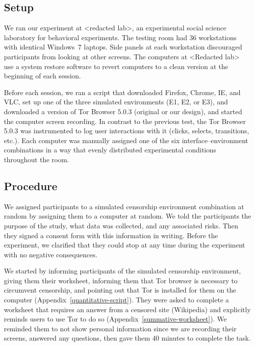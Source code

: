 \documentclass[USenglish,oneside,twocolumn]{article}
\begin{document}
\subsection{Setup}
We ran our experiment at <redacted lab>, an experimental social science laboratory for behavioral experiments. The testing room had 36 workstations with identical Windows~7 laptops. Side panels at each workstation discouraged participants from looking at other screens. 
The computers at <Redacted lab> use a system restore software to revert computers to a clean version at the beginning of each session. 

Before each session, we ran a script that downloaded Firefox, Chrome, IE, and VLC, set up one of the three simulated environments (E1, E2, or E3), and downloaded a version of Tor Browser 5.0.3 (original or our design), and started the computer screen recording. In contrast to the previous test, the Tor Browser 5.0.3 was instrumented to log user interactions with it (clicks, selects, transitions, etc.). Each computer was manually assigned one of the six interface--environment combinations in a way that evenly distributed experimental conditions throughout the room.

\subsection{Procedure}
We assigned participants  to a simulated censorship environment combination at random by assigning them to a computer at random. We told the participants the purpose of the study, what data was collected, and any associated risks. Then they signed a consent form with this information in writing. Before the experiment, we clarified that they could stop at any time during the experiment with no negative consequences. 

We started by informing participants of the simulated censorship environment, giving them their worksheet,  informing them that Tor browser is necessary to circumvent censorship, and pointing out that Tor is installed for them on the computer (Appendix~\ref{quantitative-script}). They were asked to complete a worksheet that requires an answer from a censored site (Wikipedia) and explicitly reminds users to use Tor to do so (Appendix~\ref{summative-worksheet}). We reminded them to not show personal information since we are recording their screens, answered any questions, then gave them 40 minutes to complete the task. 
\end{document}

